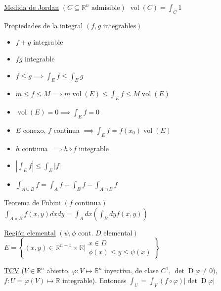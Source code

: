 \documentclass[12pt]{article}
\newcommand{\real}{\mathbb{R}}
\newcommand\setb[1]{\left\{#1\right\}}
\newcommand{\abs}[1]{\left\vert #1 \right\vert}
\DeclareMathOperator{\vol}{vol}
\DeclareMathOperator{\D}{D}
\begin{document}
\begin{multicols}{3}
    \underline{Medida de Jordan} $\left( C \subseteq \real^n \text{ admisible}\right)$
    $\vol(C) = \int_{C}1$
    
    \underline{Propiedades de la integral} $\left( f,g \text{ integrables} \right)$
    \begin{itemize}
        \itemsep0em
        \item $f+g$ integrable
        \item $fg$ integrable
        \item $f \leq g \implies \int_E f \leq \int_E g$ 
        \item $m \leq f \leq M \implies m\vol(E) \leq \int_E f \leq M\vol(E)$
        \item $\vol(E)=0 \implies \int_E f = 0$
        \item $E$ conexo, $f$ continua $\implies \int_E f = f(x_0)\vol(E)$
        \item $h$ continua $\implies h \circ f$ integrable
        \item $\abs{\int_E f} \leq \int_E \abs{f}$
        \item $\int_{A \cup B} f = \int_A f + \int_B f - \int_{A \cap B} f$
    \end{itemize}
    
    \underline{Teorema de Fubini} $\left( f \text{ continua} \right)$
    $\int_{A\times B} f(x,y) dx dy = \int_A dx \left( \int_B dy f(x,y) \right)$
    
    \underline{Región elemental} $\left( \psi, \phi \text{ cont. } D \text{ elemental} \right)$
    $E = \setb{(x,y) \in \real^{n-1} \times \real \vert \substack{x \in D \\
            \phi(x) \leq y \leq \psi(x)}}$
    
    \underline{TCV}
    ($V \in \real^n$ abierto, $\varphi \colon V \mapsto \real^n$ inyectiva, de clase $C^1$, 
    $\det \D\varphi \neq 0)$, $f \colon U=\varphi(V) \mapsto \real$ integrable). Entonces
    $\int_U = \int_V (f \circ \varphi) |\det \D \varphi|$
\end{multicols}
\newpage
\end{document}
